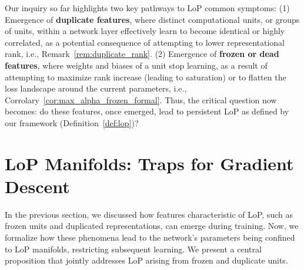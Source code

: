 \documentclass{article}
\newcommand{\GIU}[1]{\todo[color=purple!30,size=\tiny]{GIU: #1}}
\numberwithin{figure}{section}
\begin{document}
Our inquiry so far highlights two key pathways to LoP common symptoms:
    (1) 
    Emergence of \textbf{duplicate features}, where distinct computational units, or groups of units, within a network layer effectively learn to become identical or highly correlated, as a potential consequence of attempting to lower representational rank, i.e.,   Remark~\ref{rem:duplicate_rank}. 
    (2) Emergence of \textbf{frozen or dead features}, where weights and biases of a unit stop learning, as a result of attempting to maximize rank increase (leading to saturation) or to flatten the loss landscape around the current parameters, i.e., Corrolary~\ref{cor:max_alpha_frozen_formal}.
Thus, the critical question now becomes: do these features, once emerged, lead to persistent LoP as defined by our framework (Definition~\ref{def:lop})? 



\section{LoP Manifolds: Traps for Gradient Descent}
\label{sec:existence_lop_manifold}
In the previous section, we discussed how features characteristic of LoP, such as frozen units and duplicated representations, can emerge during training. Now, we formalize how these phenomena lead to the network's parameters being confined to LoP manifolds, restricting subsequent learning. We present a central proposition that jointly addresses LoP arising from frozen and duplicate units.
\end{document}
